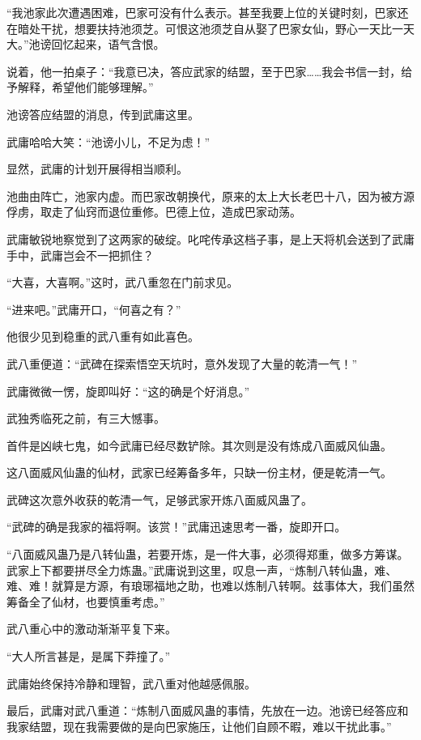 
\begin{this_body}

“我池家此次遭遇困难，巴家可没有什么表示。甚至我要上位的关键时刻，巴家还在暗处干扰，想要扶持池须芝。可恨这池须芝自从娶了巴家女仙，野心一天比一天大。”池谤回忆起来，语气含恨。

说着，他一拍桌子：“我意已决，答应武家的结盟，至于巴家……我会书信一封，给予解释，希望他们能够理解。”

池谤答应结盟的消息，传到武庸这里。

武庸哈哈大笑：“池谤小儿，不足为虑！”

显然，武庸的计划开展得相当顺利。

池曲由阵亡，池家内虚。而巴家改朝换代，原来的太上大长老巴十八，因为被方源俘虏，取走了仙窍而退位重修。巴德上位，造成巴家动荡。

武庸敏锐地察觉到了这两家的破绽。叱咤传承这档子事，是上天将机会送到了武庸手中，武庸岂会不一把抓住？

“大喜，大喜啊。”这时，武八重忽在门前求见。

“进来吧。”武庸开口，“何喜之有？”

他很少见到稳重的武八重有如此喜色。

武八重便道：“武碑在探索悟空天坑时，意外发现了大量的乾清一气！”

武庸微微一愣，旋即叫好：“这的确是个好消息。”

武独秀临死之前，有三大憾事。

首件是凶峡七鬼，如今武庸已经尽数铲除。其次则是没有炼成八面威风仙蛊。

这八面威风仙蛊的仙材，武家已经筹备多年，只缺一份主材，便是乾清一气。

武碑这次意外收获的乾清一气，足够武家开炼八面威风蛊了。

“武碑的确是我家的福将啊。该赏！”武庸迅速思考一番，旋即开口。

“八面威风蛊乃是八转仙蛊，若要开炼，是一件大事，必须得郑重，做多方筹谋。武家上下都要拼尽全力炼蛊。”武庸说到这里，叹息一声，“炼制八转仙蛊，难、难、难！就算是方源，有琅琊福地之助，也难以炼制八转啊。兹事体大，我们虽然筹备全了仙材，也要慎重考虑。”

武八重心中的激动渐渐平复下来。

“大人所言甚是，是属下莽撞了。”

武庸始终保持冷静和理智，武八重对他越感佩服。

最后，武庸对武八重道：“炼制八面威风蛊的事情，先放在一边。池谤已经答应和我家结盟，现在我需要做的是向巴家施压，让他们自顾不暇，难以干扰此事。”


\end{this_body}
